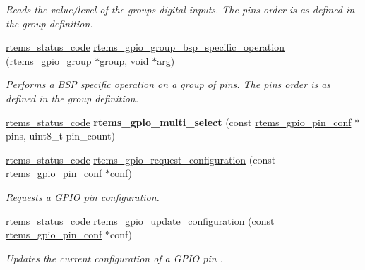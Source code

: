 \begin{DoxyCompactItemize}
\begin{DoxyCompactList}\small\item\em Reads the value/level of the group\textquotesingle{}s digital inputs. The pins order is as defined in the group definition. \end{DoxyCompactList}\item 
\mbox{\hyperlink{group__ClassicStatus_ga545d41846817eaba6143d52ee4d9e9fe}{rtems\+\_\+status\+\_\+code}} \mbox{\hyperlink{gpio-support_8c_a1658da3186e28124ec5fe11f29c4e02a}{rtems\+\_\+gpio\+\_\+group\+\_\+bsp\+\_\+specific\+\_\+operation}} (\mbox{\hyperlink{structrtems__gpio__group}{rtems\+\_\+gpio\+\_\+group}} $\ast$group, void $\ast$arg)
\begin{DoxyCompactList}\small\item\em Performs a B\+SP specific operation on a group of pins. The pins order is as defined in the group definition. \end{DoxyCompactList}\item 
\mbox{\label{gpio-support_8c_a1d543b10e6645eee41a5a0e2662a231d}} 
\mbox{\hyperlink{group__ClassicStatus_ga545d41846817eaba6143d52ee4d9e9fe}{rtems\+\_\+status\+\_\+code}} {\bfseries rtems\+\_\+gpio\+\_\+multi\+\_\+select} (const \mbox{\hyperlink{structrtems__gpio__pin__conf}{rtems\+\_\+gpio\+\_\+pin\+\_\+conf}} $\ast$pins, uint8\+\_\+t pin\+\_\+count)
\item 
\mbox{\hyperlink{group__ClassicStatus_ga545d41846817eaba6143d52ee4d9e9fe}{rtems\+\_\+status\+\_\+code}} \mbox{\hyperlink{gpio-support_8c_ac22d10d49dd19cc62b50fff42945a57a}{rtems\+\_\+gpio\+\_\+request\+\_\+configuration}} (const \mbox{\hyperlink{structrtems__gpio__pin__conf}{rtems\+\_\+gpio\+\_\+pin\+\_\+conf}} $\ast$conf)
\begin{DoxyCompactList}\small\item\em Requests a G\+P\+IO pin configuration. \end{DoxyCompactList}\item 
\mbox{\hyperlink{group__ClassicStatus_ga545d41846817eaba6143d52ee4d9e9fe}{rtems\+\_\+status\+\_\+code}} \mbox{\hyperlink{gpio-support_8c_a8953ad3c39c57114472330be3043ca54}{rtems\+\_\+gpio\+\_\+update\+\_\+configuration}} (const \mbox{\hyperlink{structrtems__gpio__pin__conf}{rtems\+\_\+gpio\+\_\+pin\+\_\+conf}} $\ast$conf)
\begin{DoxyCompactList}\small\item\em Updates the current configuration of a G\+P\+IO pin . \end{DoxyCompactList}\item 

\end{DoxyCompactItemize}
